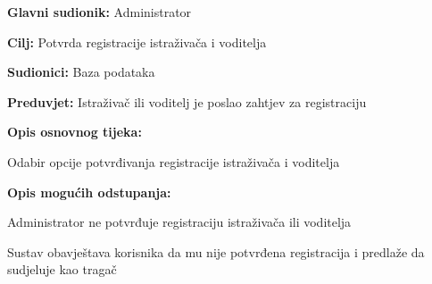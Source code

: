 					
					\noindent {}
					\begin{packed_item}
						
						\item \textbf{Glavni sudionik: }Administrator
						\item  \textbf{Cilj:} Potvrda registracije istraživača i voditelja
						\item  \textbf{Sudionici:} Baza podataka
						\item  \textbf{Preduvjet:} Istraživač ili voditelj je poslao zahtjev za registraciju
						\item  \textbf{Opis osnovnog tijeka:}
						
						\item[] \begin{packed_enum}
							
							\item Odabir opcije potvrđivanja registracije istraživača i voditelja
							
						\end{packed_enum}
						
						\item  \textbf{Opis mogućih odstupanja:}
						
						\item[] \begin{packed_item}
							
							\item[1.a] Administrator ne potvrđuje registraciju istraživača ili voditelja
							\item[] \begin{packed_enum}
								
								\item Sustav obavještava korisnika da mu nije potvrđena registracija i predlaže da sudjeluje kao tragač
								
								\end{packed_enum}
							
						\end{packed_item}
						
					\end{packed_item}
					

